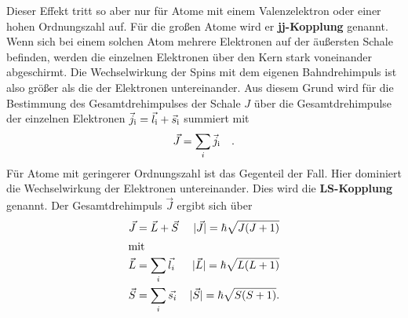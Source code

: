\noindent
Dieser Effekt tritt so aber nur für Atome mit einem Valenzelektron oder einer hohen Ordnungszahl auf. Für die großen Atome wird er \textbf{jj-Kopplung} genannt. 
Wenn sich bei einem solchen Atom mehrere Elektronen auf der äußersten Schale befinden, werden die einzelnen Elektronen über den Kern stark voneinander abgeschirmt.
Die Wechselwirkung der Spins mit dem eigenen Bahndrehimpuls ist also größer als die der Elektronen untereinander.
Aus diesem Grund wird für die Bestimmung des Gesamtdrehimpulses der Schale $J$ über die Gesamtdrehimpulse der einzelnen Elektronen $\vec j_{\text{i}} = \vec{l}_{\text{i}} + \vec{s}_{\text{i}}$ 
summiert mit 
\begin{equation*}
    \vec J = \sum_i \vec j_{\text{i}} \quad.
\end{equation*}
Für Atome mit geringerer Ordnungszahl ist das Gegenteil der Fall. Hier dominiert die Wechselwirkung der Elektronen untereinander. 
Dies wird die \textbf{LS-Kopplung} genannt. Der Gesamtdrehimpuls $\vec J $ ergibt sich über 
\begin{align}
    \vec{J} &= \vec{L} + \vec{S} & |\vec{J}| = \hbar \sqrt{J(J+1)}\\
    \intertext{mit}
    \vec{L} &= \sum_i \vec{l_i}  & |\vec{L}| = \hbar \sqrt{L(L+1)}\\
    \vec{S} &= \sum_i \vec{s_i}  & |\vec{S}| = \hbar \sqrt{S(S+1)}.
\end{align}\\

